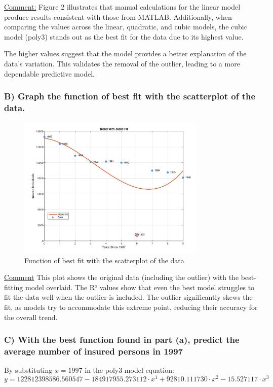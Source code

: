 \documentclass[12pt]{article}
\begin{document}
\uline{Comment:} 
Figure 2 illustrates that manual calculations for the linear model produce results consistent with those from MATLAB. Additionally, when comparing the  values across the linear, quadratic, and cubic models, the cubic model (poly3) stands out as the best fit for the data due to its highest  value.

The higher  values suggest that the model provides a better explanation of the data's variation. This validates the removal of the outlier, leading to a more dependable predictive model. 

\subsubsection*{B) Graph the function of best fit with the scatterplot of the data.}

\begin{figure}[H]
    \centering
    \includegraphics[width=0.8\textwidth]{3.png}
    \caption{Function of best fit with the scatterplot of the data}
\end{figure}

\uline{Comment}
This plot shows the original data (including the outlier) with the best-fitting model overlaid.
The R² values show that even the best model struggles to fit the data well when the outlier
is included. The outlier significantly skews the fit, as models try to accommodate this
extreme point, reducing their accuracy for the overall trend.

\subsubsection*{C) With the best function found in part (a), predict the average number of insured persons in 1997}
By substituting \( x = 1997 \) in the poly3 model equation:
\[
y = 122812398586.560547 - 184917955.273112 \cdot x^1 + 92810.111730 \cdot x^2 - 15.527117 \cdot x^3
\]
\end{document}
